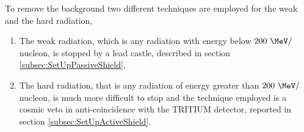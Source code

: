 To remove the background two different techniques are employed for the weak and the hard radiation,

\begin{enumerate}

\item{}  The weak radiation, which is any radiation with energy below $200~\MeV/$nucleon, is stopped by a lead castle, described in section \ref{subsec:SetUpPassiveShield},

\item{} The hard radiation, that is any radiation of energy greater than $200~\MeV/$nucleon, is much more difficult to stop and the technique employed is a cosmic veto in anti-coincidence with the TRITIUM detector, reported in section \ref{subsec:SetUpActiveShield}. %

\end{enumerate}